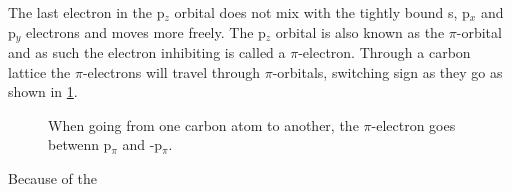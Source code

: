 The last electron in the p\(_z\) orbital does not mix with the tightly bound s, p\(_x\) and p\(_y\) electrons and moves more freely. The p\(_z\) orbital is also known as the \(\pi\)-orbital and as such the electron inhibiting is called a \(\pi\)-electron. Through a carbon lattice the \(\pi\)-electrons will travel through \(\pi\)-orbitals, switching sign as they go as shown in \cref{sign}.
\begin{figure}[H]
	\begin{center}
		\caption{When going from one carbon atom to another, the \(\pi\)-electron goes betwenn p\(_\pi\) and -p\(_\pi\).}
		\label{sign}
	\end{center}
\end{figure}
\cite{calogero_electron_2019}
Because of the 